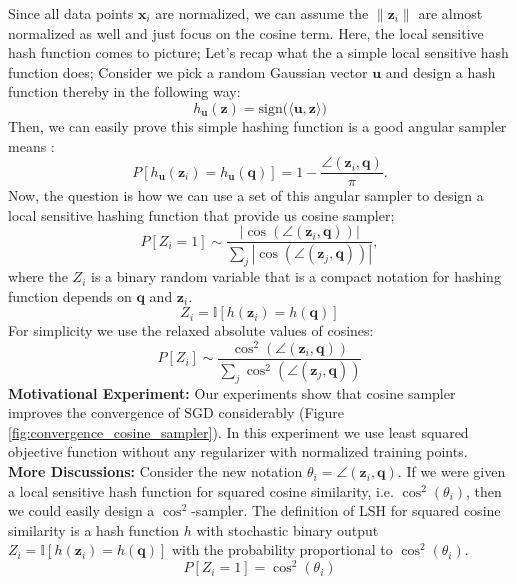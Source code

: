 \documentclass[11pt, a4paper, reqno, twoside]{scrartcl}
\theoremstyle{style}
\newcommand{\z}{\bm{z}}
\newcommand{\qv}{\bm{q}}
\newcommand{\uv}{\bm{u}}
\newcommand{\xv}{\bm{x}}
\newcommand{\indic}{\mathbb{I}}
\newcommand{\0}{\mathbf{0}} %
\begin{document}
Since all data points $\xv_i$ are normalized, we can assume the 
$\|\z_i\|$ are almost normalized as well and just focus on the cosine term. 
Here, the local sensitive hash function comes to picture; 
Let's recap what the a simple local sensitive hash function does; Consider we
pick a random Gaussian vector $\uv$ and design a hash function thereby in the
following way:
\begin{equation*}
	h_{\uv}(\z) = \text{sign(} \langle \uv, \z \rangle \text{)}
\end{equation*}
Then, we can easily prove this simple hashing function is a good angular sampler
means \cite{charikar2002similarity}:
\begin{equation*}
	P[h_{\uv}(\z_i) = h_{\uv}(\qv)] = 1-\frac{\angle(\z_i,\qv)}{\pi}.
\end{equation*}
Now, the question is how we can use a set of this angular sampler to design a
local sensitive hashing function that provide us cosine sampler; 
\begin{equation*}
	P[Z_i = 1] \sim \frac{|\cos(\angle(\z_i,\qv))|}{\sum_{j}
	|\cos(\angle(\z_j,\qv))|},
\end{equation*}
where the $Z_i$ is a binary random variable that is a compact notation for
hashing function depends on $\qv$ and $\z_i$.
\begin{equation*}
	Z_i = \indic[h(\z_i) = h(\qv)]
\end{equation*}
 For simplicity we use the relaxed
absolute values of cosines:
\begin{equation*}
 P[Z_i] \sim \frac{\cos^2(\angle(\z_i,\qv))}{\sum_{j}
	\cos^2(\angle(\z_j,\qv))}
\end{equation*}
\textbf{Motivational Experiment:}
Our experiments show that cosine sampler improves the convergence of SGD
considerably (Figure \ref{fig:convergence_cosine_sampler}). In this experiment
we use least squared objective function without any regularizer with normalized
training points. \\
\textbf{More Discussions:} 
Consider the new notation $\theta_i = \angle(\z_i,\qv)$. 
If we were given a local sensitive hash function for squared cosine similarity,
i.e. $\cos^2(\theta_i)$, then we could easily design a $\cos^2$-sampler. The
definition of LSH for squared cosine similarity is a hash function $h$ with
stochastic binary output $Z_i = \indic[h(\z_i) = h(\qv)]$ with the probability
proportional to  $\cos^2(\theta_i)$. 
\begin{equation*}
	P[Z_i = 1] = \cos^2(\theta_i) 
\end{equation*}
\end{document}
